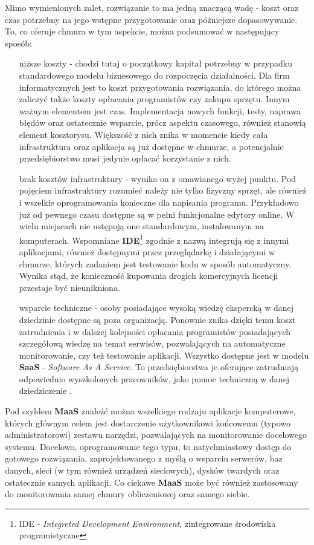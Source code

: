 Mimo wymienionych zalet, rozwiązanie to ma jedną znaczącą wadę - koszt oraz czas potrzebny na jego wstępne przygotowanie oraz
późniejsze dopasowywanie. To, co oferuje chmura w tym aspekcie, można podsumować w następujący sposób:
\begin{itemize}
    \item[niższe koszty] - chodzi tutaj o początkowy kapitał potrzebny w przypadku standardowego modelu biznesowego do
    rozpoczęcia działalności. Dla firm informatycznych jest to koszt przygotowania rozwiązania, do którego można zaliczyć także koszty opłacania programistów czy zakupu sprzętu. Innym ważnym elementem jest czas. Implementacja nowych funkcji, testy, naprawa
    błędów oraz ostatecznie wsparcie, prócz aspektu czasowego, również stanowią element kosztorysu. Większość z nich znika w momencie
    kiedy cała infrastruktura oraz aplikacja są już dostępne w chmurze, a potencjalnie przedsiębiorstwo musi jedynie opłacać korzystanie z nich.
    \item[brak kosztów infrastruktury] - wynika on z omawianego wyżej punktu. Pod pojęciem infrastruktury rozumieć należy nie
    tylko fizyczny sprzęt, ale również i wszelkie oprogramowania konieczne dla napisania programu. Przykładowo już od pewnego czasu
    dostępne są w pełni funkcjonalne edytory online. W wielu miejscach nie ustępują one standardowym, instalowanym na komputerach.
    Wspomniane \textbf{IDE}\footnote{IDE - \textit{Integreted Development Environment}, zintegrowane środowiska programistyczne} zgodnie
    z nazwą integrują się z innymi aplikacjami, również dostępnymi przez przeglądarkę i działającymi w chmurze, których zadaniem jest
    testowanie kodu w sposób automatyczny. Wynika stąd, że konieczność kupowania drogich komercyjnych licencji przestaje być nieunikniona.
    \item[wsparcie techniczne] - osoby posiadające wysoką wiedzę ekspercką w danej dziedzinie dostępne są poza organizacją. Ponownie
    znika dzięki temu koszt zatrudnienia i w dalszej kolejności opłacania programistów posiadających szczegółową wiedzę na temat serwisów, pozwalających
    na automatyczne monitorowanie, czy też testowanie aplikacji. Wszystko dostępne jest w modelu \textbf{SaaS} - \textit{Software As A Service}.
    To przedsiębiorstwa je oferujące zatrudniają odpowiednio wyszkolonych pracowników, jako pomoc techniczną w danej dziedziczenie \cite{maas_does_it_work}.
\end{itemize}

Pod szyldem \textbf{MaaS} znaleźć można wszelkiego rodzaju aplikacje komputerowe, których głównym celem jest dostarczenie użytkownikowi końcowemu (typowo administratorowi) zestawu narzędzi, pozwalających na monitorowanie docelowego systemu. Docelowo, oprogramowanie tego typu, to natychmiastowy dostęp do gotowego rozwiązania,
zaprojektowanego z myślą o wsparciu serwerów, baz danych, sieci (w tym również urządzeń sieciowych), dysków twardych
oraz ostatecznie samych aplikacji. Co ciekawe \textbf{MaaS} może być również zastosowany do monitorowania
samej chmury obliczeniowej oraz samego siebie. 